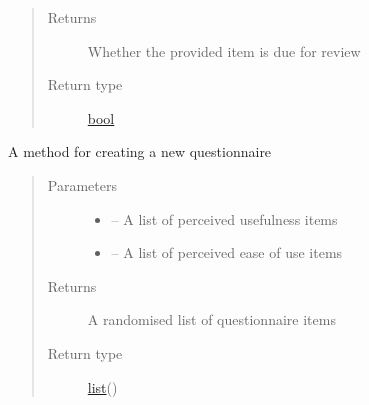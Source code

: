 \documentclass[letterpaper,10pt,english]{sphinxmanual}
\begin{document}
\begin{fulllineitems}
\begin{fulllineitems}
\begin{quote}
\begin{description}
\item[{Returns}] \leavevmode
Whether the provided item is due for review

\item[{Return type}] \leavevmode
\href{https://docs.python.org/2/library/functions.html\#bool}{bool}

\end{description}\end{quote}

\end{fulllineitems}


\begin{fulllineitems}
\label{\detokenize{user:user.User.create_questionnaire}}
A method for creating a new questionnaire
\begin{quote}\begin{description}
\item[{Parameters}] \leavevmode\begin{itemize}
\item {} 
 -- A list of perceived usefulness items

\item {} 
 -- A list of perceived ease of use items

\end{itemize}

\item[{Returns}] \leavevmode
A randomised list of questionnaire items

\item[{Return type}] \leavevmode
\href{https://docs.python.org/2/library/functions.html\#list}{list}({\hyperref[\detokenize{questionnaire_item:questionnaire_item.QuestionnaireItem}]{}})

\end{description}\end{quote}

\end{fulllineitems}



\end{fulllineitems}
\end{document}

